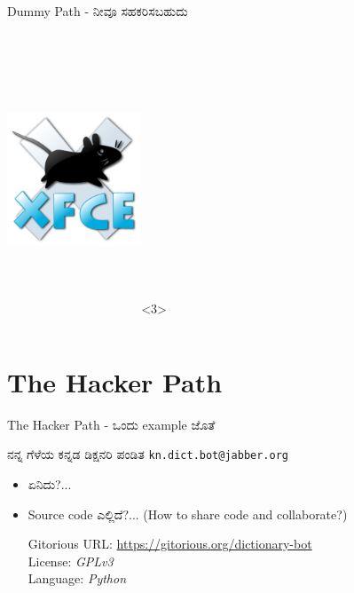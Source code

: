 \documentclass[slidestop,compress,brown]{beamer}
\newcommand\en[1]{{\english #1}}
\begin{document}
\begin{frame}{\en{Dummy Path -} ನೀವೂ ಸಹಕರಿಸಬಹುದು}
\begin{columns}[c]
    \includegraphics[width=4cm,height=8cm,keepaspectratio]{xfce4}<3>
  \end{columns}
\end{frame}

\section{\en{The Hacker Path}}
\begin{frame}{\en{The Hacker Path -} ಒಂದು \en{example} ಜೊತೆ}
  \begin{block}{ನನ್ನ ಗೆಳೆಯ ಕನ್ನಡ ಡಿಕ್ಷನರಿ ಪಂಡಿತ}
    \texttt{\en{kn.dict.bot@jabber.org}}
  \end{block}
  \begin{itemize}[<+->]
  \item<+-| alert@+> ಏನಿದು?...
  \item<+-| alert@+> \en{Source code} ಎಲ್ಲಿದೆ?... \en{(How to share code and collaborate?)}
    \vfill
    \begin{flushright}
      \begin{block}{\en{Gitorious}}
        \tiny{\en{URL: \url{https://gitorious.org/dictionary-bot}\\
        License: \emph{GPLv3}\\
        Language: \emph{Python}}}
      \end{block}
    \end{flushright}
  \end{itemize}
\end{frame}
\end{document}
